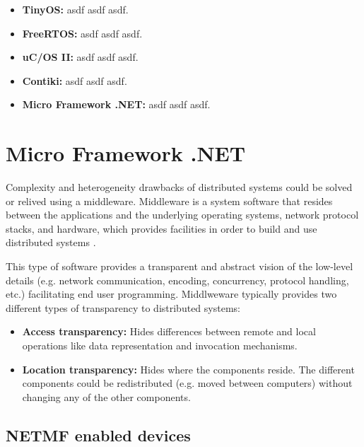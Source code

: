 \begin{itemize}
\item \textbf{TinyOS:} asdf asdf asdf.

\item \textbf{FreeRTOS:} asdf asdf asdf.

\item \textbf{uC/OS II:} asdf asdf asdf.

\item \textbf{Contiki:} asdf asdf asdf.

\item \textbf{Micro Framework .NET:} asdf asdf asdf.
\end{itemize}



\section{Micro Framework .NET}\label{S:MicroFramework}

Complexity and heterogeneity drawbacks of distributed systems could be solved or relived using a middleware. Middleware is a system software that resides between the applications and the underlying operating systems, network protocol stacks, and hardware, which provides facilities in order to build and use distributed systems \cite{cite:middleware}.

This type of software provides a transparent and abstract vision of the low-level details (e.g. network communication, encoding, concurrency, protocol handling, etc.) facilitating end user programming. Middlweware typically provides two different types of transparency to distributed systems:

\begin{itemize}
\item \textbf{Access transparency:} Hides differences between remote and local operations like data representation and invocation mechanisms.

\item \textbf{Location transparency:} Hides where the components reside. The  different components could be 
redistributed (e.g. moved between computers) without changing any of the other components.
\end{itemize}

\subsection{NETMF enabled devices}\label{SS:MicroFramework-Devices}

